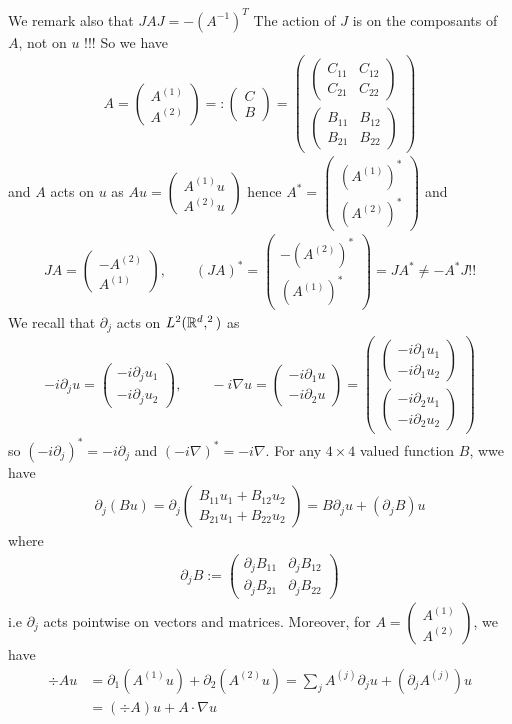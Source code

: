 \documentclass[11pt,a4paper,reqno,french,tikz]{amsart}
\let\C\relax\newcommand{\C}{\mathbb{C}}\newcommand{\Z}{\mathbb{Z}}\newcommand{\R}{\mathbb{R}}\newcommand{\N}{\mathbb{N}}\newcommand{\Q}{\mathbb{Q}}\newcommand{\bbM}{\mathbb{M}}
\newcommand{\pa}[1]{\left( #1 \right)} %
\newcommand{\na}{\nabla} %
\newcommand{\mat}[1]{\begin{pmatrix} #1 \end{pmatrix}} %
\begin{document}
We remark also that $J A J = - \pa{A^{-1}}^T$
The action of $J$ is on the composants of $A$, not on $u$ !!! So we have 
\begin{align*}
A = \mat{A^{(1)} \\ A^{(2)}} =: \mat{C \\ B} = \mat{\mat{C_{11} & C_{12} \\ C_{21} & C_{22}} \\ \mat{B_{11} & B_{12} \\ B_{21} & B_{22}}}
\end{align*}
and $A$ acts on $u$ as $A u = \mat{A^{(1)} u \\ A^{(2)} u}$ hence $A^* = \mat{\pa{A^{(1)}}^* \\ \pa{A^{(2)}}^*}$ and
\begin{align*}
JA = \mat{-A^{(2)} \\ A^{(1)}}, \qquad \pa{JA}^* = \mat{-\pa{A^{(2)}}^* \\ \pa{A^{(1)}}^*} = J A^* \neq -A^* J !!
\end{align*}
We recall that $\partial_j$ acts on $L^2(\R^d,\C^2)$ as
\begin{align*}
-i \partial_j u = \mat{-i\partial_j u_1 \\ -i\partial_j u_2}, \qquad -i\na u = \mat{-i\partial_1 u \\ -i\partial_2 u} = \mat{\mat{-i\partial_1 u_1 \\ -i\partial_1 u_2} \\ \mat{-i\partial_2 u_1 \\ -i\partial_2 u_2}}
\end{align*}
so $\pa{-i\partial_j}^* = -i\partial_j$ and $\pa{-i\na}^* = -i\na$. For any $4\times 4$ valued function $B$, wwe have
\begin{align*}
\partial_j \pa{B u} = \partial_j \mat{B_{11} u_1 + B_{12} u_2 \\ B_{21} u_1 + B_{22} u_2} = B \partial_j u + \pa{\partial_j B}u 
\end{align*}
where
\begin{align*}
	\partial_j B := \mat{\partial_j B_{11} & \partial_j B_{12} \\ \partial_j B_{21} & \partial_j B_{22}}
\end{align*}
i.e $\partial_j$ acts pointwise on vectors and matrices. Moreover, for $A = \mat{A^{(1)} \\ A^{(2)}}$, we have
\begin{align*}
	\div A u & = \partial_1 \pa{A^{(1)} u} + \partial_2 \pa{A^{(2)} u} = \sum_j A^{(j)} \partial_j u + \pa{\partial_j A^{(j)}}u  \\
& = \pa{\div A}u  + A \cdot \na u
\end{align*}
\end{document}
